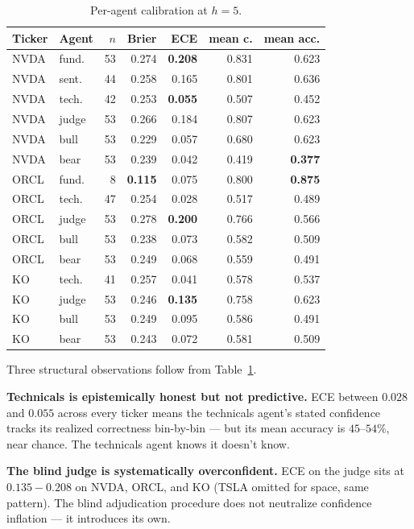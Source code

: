 \documentclass[conference]{IEEEtran}
\begin{document}
\begin{table}[t]
\caption{Per-agent calibration at $h{=}5$.}
\label{tab:calibration}
\centering\scriptsize
\begin{tabular}{llrrrrr}
\toprule
Ticker & Agent & $n$ & Brier & ECE & mean c. & mean acc. \\
\midrule
NVDA & fund.      & 53 & 0.274 & \textbf{0.208} & 0.831 & 0.623 \\
NVDA & sent.      & 44 & 0.258 & 0.165          & 0.801 & 0.636 \\
NVDA & tech.      & 42 & 0.253 & \textbf{0.055} & 0.507 & 0.452 \\
NVDA & judge      & 53 & 0.266 & 0.184          & 0.807 & 0.623 \\
NVDA & bull       & 53 & 0.229 & 0.057          & 0.680 & 0.623 \\
NVDA & bear       & 53 & 0.239 & 0.042          & 0.419 & \textbf{0.377} \\
\midrule
ORCL & fund.      &  8 & \textbf{0.115} & 0.075 & 0.800 & \textbf{0.875} \\
ORCL & tech.      & 47 & 0.254 & 0.028          & 0.517 & 0.489 \\
ORCL & judge      & 53 & 0.278 & \textbf{0.200} & 0.766 & 0.566 \\
ORCL & bull       & 53 & 0.238 & 0.073          & 0.582 & 0.509 \\
ORCL & bear       & 53 & 0.249 & 0.068          & 0.559 & 0.491 \\
\midrule
KO   & tech.      & 41 & 0.257 & 0.041          & 0.578 & 0.537 \\
KO   & judge      & 53 & 0.246 & \textbf{0.135} & 0.758 & 0.623 \\
KO   & bull       & 53 & 0.249 & 0.095          & 0.586 & 0.491 \\
KO   & bear       & 53 & 0.243 & 0.072          & 0.581 & 0.509 \\
\bottomrule
\end{tabular}
\end{table}

Three structural observations follow from Table~\ref{tab:calibration}.

\textbf{Technicals is epistemically honest but not predictive.}
ECE between $0.028$ and $0.055$ across every ticker means the
technicals agent's stated confidence tracks its realized correctness
bin-by-bin --- but its mean accuracy is $45$--$54\%$, near chance.
The technicals agent knows it doesn't know.

\textbf{The blind judge is systematically overconfident.}
ECE on the judge sits at $0.135{-}0.208$ on NVDA, ORCL, and KO
(TSLA omitted for space, same pattern). The blind adjudication
procedure does not neutralize confidence inflation --- it
introduces its own.
\end{document}
